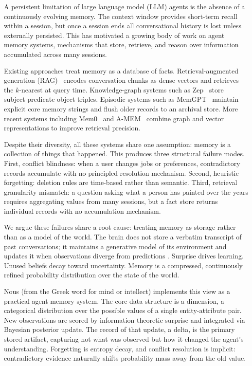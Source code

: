 \documentclass[11pt,a4paper,twocolumn]{article}
\begin{document}
A persistent limitation of large language model (LLM) agents is the absence
of a continuously evolving memory. The context window provides short-term
recall within a session, but once a session ends all conversational history
is lost unless externally persisted. This has motivated a growing body of
work on agent memory systems, mechanisms that store, retrieve, and reason
over information accumulated across many sessions.

Existing approaches treat memory as a database of facts. Retrieval-augmented
generation (RAG)~\citep{lewis2020rag} encodes conversation chunks as dense
vectors and retrieves the $k$-nearest at query time. Knowledge-graph systems
such as Zep~\citep{zep2024graphiti} store subject-predicate-object triples.
Episodic systems such as MemGPT~\citep{packer2023memgpt} maintain explicit
core memory strings and flush older records to an archival store. More recent
systems including Mem0~\citep{chhikara2025mem0} and A-MEM~\citep{xu2025amem}
combine graph and vector representations to improve retrieval precision.

Despite their diversity, all these systems share one assumption: memory is a
collection of things that happened. This produces three structural failure
modes. First, conflict blindness: when a user changes jobs or preferences,
contradictory records accumulate with no principled resolution mechanism.
Second, heuristic forgetting: deletion rules are time-based rather than
semantic. Third, retrieval granularity mismatch: a question asking what a
person has painted over the years requires aggregating values from many
sessions, but a fact store returns individual records with no accumulation
mechanism.

We argue these failures share a root cause: treating memory as storage rather
than as a model of the world. The brain does not store a verbatim transcript
of past conversations; it maintains a generative model of its environment and
updates it when observations diverge from predictions
\citep{rao1999predictive,friston2010fep}. Surprise drives learning. Unused
beliefs decay toward uncertainty. Memory is a compressed, continuously refined
probability distribution over the state of the world.

Nous (from the Greek word for mind or intellect) implements this view as a
practical agent memory system. The core data structure is a dimension, a
categorical distribution over the possible values of a single entity-attribute
pair. New observations are scored by information-theoretic surprise and
integrated via Bayesian posterior update. The record of that update, a delta,
is the primary stored artifact, capturing not what was observed but how it
changed the agent's understanding. Forgetting is entropy decay, and conflict
resolution is implicit: contradictory evidence naturally shifts probability
mass away from the old value.
\end{document}
